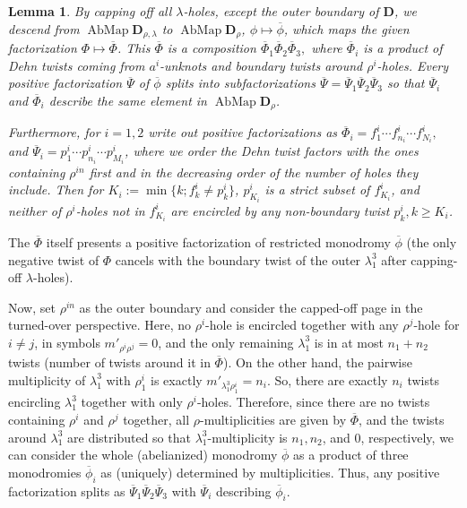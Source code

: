 \documentclass{amsart}
\newtheorem{lem}[thm]{Lemma}
\theoremstyle{definition}
\begin{document}
\begin{lem}\label{l1} 
By capping off all $\lambda$-holes, except the outer boundary of $\mathbf D$, we descend from $\operatorname{AbMap} \mathbf D_{\rho,\lambda}$ to $\operatorname{AbMap} \mathbf D_{\rho}$, $\phi\mapsto \overline{\phi}$, which maps the given factorization $\Phi\mapsto\overline\Phi$. This $\overline\Phi$ is a composition $\overline{\Phi}_1\overline{\Phi}_2\overline{\Phi}_3,$ where $\overline{\Phi}_i$ is a product of Dehn twists coming from $a^i$-unknots and boundary twists around $\rho^i$-holes. Every positive factorization $\overline\Psi$ of  $\overline\phi$ splits into subfactorizations $\overline\Psi=\overline{\Psi}_1\overline{\Psi}_2\overline{\Psi}_3$ so that $\overline{\Psi}_i$ and $\overline{\Phi}_i$ describe the same element in $\operatorname{AbMap}\mathbf D_{\rho}$.

Furthermore, for $i=1,2$ write out positive factorizations as $\overline{\Phi}_i=f_1^i\cdots f_{n_i}^i\cdots f_{N_i}^i,$ and $\overline{\Psi}_i=p_1^i\cdots p_{n_i}^i\cdots p_{M_i}^i$, where we order the Dehn twist factors with the ones containing $\rho^{in}$ first and in the decreasing order of the number of holes they include. Then for $K_i:=\min\{k;f_k^i\neq p_k^i\}$, $p_{K_i}^i$ is a strict subset of $f_{K_i}^i$, and neither of $\rho^i$-holes not in $f_{K_i}^i$ are encircled by any non-boundary twist $p_k^i,k\geq K_i$.
\end{lem}

\proof
The $\overline\Phi$ itself presents a positive factorization of restricted monodromy $\overline\phi$ (the only negative twist of $\Phi$ cancels with the boundary twist of the outer $\lambda_1^3$ after capping-off $\lambda$-holes).

Now, set $\rho^{in}$ as the outer boundary and consider the capped-off page in the turned-over perspective. Here, no $\rho^i$-hole is encircled together with any $\rho^j$-hole for $i\neq j$, in symbols $m'_{\rho^i\rho^j}=0$, and the only remaining $\lambda_1^3$ is in at most $n_1+n_2$ twists (number of twists around it in $\overline\Phi$). On the other hand, the pairwise multiplicity of $\lambda_1^3$ with $\rho_1^i$ is exactly $m'_{\lambda_1^3\rho_1^i}=n_i$. So, there are exactly $n_i$ twists encircling $\lambda_1^3$ together with only $\rho^i$-holes. Therefore, since there are no twists containing $\rho^i$ and $\rho^j$ together, all $\rho$-multiplicities are given by $\overline\Phi$, and the twists around $\lambda_1^3$ are distributed so that $\lambda_1^3$-multiplicity is $n_1,n_2$, and $0$, respectively, we can consider the whole (abelianized) monodromy $\overline\phi$ as a product of three monodromies $\overline\phi_i$ as (uniquely) determined by multiplicities. Thus, any positive factorization splits as $\overline{\Psi}_1\overline{\Psi}_2\overline{\Psi}_3$ with $\overline\Psi_i$ describing $\overline\phi_i$.
\end{document}
